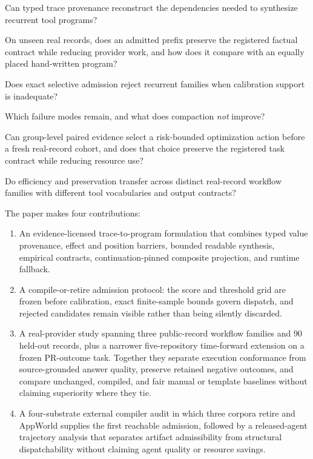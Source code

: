 \begin{description}[leftmargin=1.3em,labelindent=0em]
  \item[RQ1.] Can typed trace provenance reconstruct the dependencies needed to synthesize
  recurrent tool programs?
  \item[RQ2.] On unseen real records, does an admitted prefix preserve the registered
  factual contract while reducing provider work, and how does it compare with an equally
  placed hand-written program?
  \item[RQ3.] Does exact selective admission reject recurrent families when calibration
  support is inadequate?
  \item[RQ4.] Which failure modes remain, and what does compaction \emph{not} improve?
  \item[RQ5.] Can group-level paired evidence select a risk-bounded optimization action
  before a fresh real-record cohort, and does that choice preserve the registered task
  contract while reducing resource use?
  \item[RQ6.] Do efficiency and preservation transfer across distinct
  real-record workflow families with different tool vocabularies and output contracts?
\end{description}

The paper makes four contributions:

\begin{enumerate}[leftmargin=*]
  \item An evidence-licensed trace-to-program formulation that combines typed value
  provenance, effect and position barriers, bounded readable synthesis, empirical
  contracts, continuation-pinned composite projection, and runtime fallback.
  \item A compile-or-retire admission protocol: the score and threshold grid are frozen
  before calibration, exact finite-sample bounds govern dispatch, and rejected candidates
  remain visible rather than being silently discarded.
  \item A real-provider study spanning three public-record workflow families and 90
  held-out records, plus a narrower five-repository time-forward extension on a frozen
  PR-outcome task.  Together they separate execution conformance from source-grounded
  answer quality, preserve retained negative outcomes, and compare unchanged, compiled,
  and fair manual or template baselines without claiming superiority where they tie.
  \item A four-substrate external compiler audit in which three corpora retire and
  AppWorld supplies the first reachable admission, followed by a released-agent
  trajectory analysis that separates artifact admissibility from structural
  dispatchability without claiming agent quality or resource savings.
\end{enumerate}

